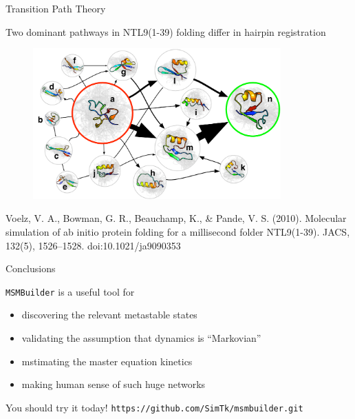 \documentclass{beamer}
\begin{document}
\begin{frame}{Transition Path Theory}

Two dominant pathways in NTL9(1-39) folding differ in hairpin registration

\begin{figure}
\includegraphics[width=0.85\textwidth]{TPT-ntl9}
\end{figure}


\tiny
Voelz, V. A., Bowman, G. R., Beauchamp, K., \& Pande, V. S. (2010). Molecular simulation of ab initio protein folding for a millisecond folder NTL9(1-39). JACS, 132(5), 1526–1528. doi:10.1021/ja9090353
\normalsize

\end{frame}


\begin{frame}{Conclusions}

\texttt{MSMBuilder} is a useful tool for

\begin{itemize}
  \item discovering the relevant metastable states
  \item validating the assumption that dynamics is ``Markovian''
  \item mstimating the master equation kinetics 
  \item making human sense of such huge networks
\end{itemize}

You should try it today!  \texttt{https://github.com/SimTk/msmbuilder.git}

\end{frame}
\end{document}
